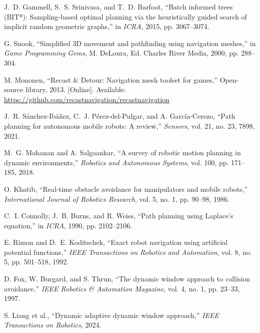 \documentclass[12pt,a4paper,oneside]{book}
\begin{document}
\begin{enumerate}[label={[\arabic*]}, leftmargin=*]
\item \label{Gammell2015} J.~D. Gammell, S.~S. Srinivasa, and T.~D. Barfoot, ``Batch informed trees (BIT*): Sampling-based optimal planning via the heuristically guided search of implicit random geometric graphs,'' in \emph{ICRA}, 2015, pp. 3067--3074.

\item \label{Snook2000} G. Snook, ``Simplified 3D movement and pathfinding using navigation meshes,'' in \emph{Game Programming Gems}, M. DeLoura, Ed. Charles River Media, 2000, pp. 288--304.

\item \label{Mononen2013} M. Mononen, ``Recast \& Detour: Navigation mesh toolset for games,'' Open-source library, 2013. [Online]. Available: \url{https://github.com/recastnavigation/recastnavigation}

\item \label{SanchezIbanez2021} J.~R. Sánchez-Ibáñez, C.~J. Pérez-del-Pulgar, and A. García-Cerezo, ``Path planning for autonomous mobile robots: A review,'' \emph{Sensors}, vol. 21, no. 23, 7898, 2021.

\item \label{Mohanan2018} M.~G. Mohanan and A. Salgoankar, ``A survey of robotic motion planning in dynamic environments,'' \emph{Robotics and Autonomous Systems}, vol. 100, pp. 171--185, 2018.

\item \label{Khatib1986} O. Khatib, ``Real-time obstacle avoidance for manipulators and mobile robots,'' \emph{International Journal of Robotics Research}, vol. 5, no. 1, pp. 90--98, 1986.

\item \label{Connolly1990} C.~I. Connolly, J.~B. Burns, and R. Weiss, ``Path planning using Laplace's equation,'' in \emph{ICRA}, 1990, pp. 2102--2106.

\item \label{Rimon1992} E. Rimon and D.~E. Koditschek, ``Exact robot navigation using artificial potential functions,'' \emph{IEEE Transactions on Robotics and Automation}, vol. 8, no. 5, pp. 501--518, 1992.

\item \label{Fox1997} D. Fox, W. Burgard, and S. Thrun, ``The dynamic window approach to collision avoidance,'' \emph{IEEE Robotics \& Automation Magazine}, vol. 4, no. 1, pp. 23--33, 1997.

\item \label{Liang2024} S. Liang et al., ``Dynamic adaptive dynamic window approach,'' \emph{IEEE Transactions on Robotics}, 2024.


\end{enumerate}
\end{document}
